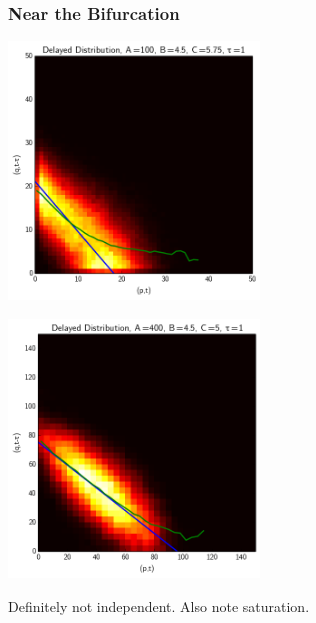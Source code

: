 \documentclass[xcolor={usenames,dvipsnames,svgnames}]{beamer}
\begin{document}
\begin{frame}
    \frametitle{Near the Bifurcation}

    \begin{overprint}
        \begin{center}
        \includegraphics[width=0.5\textwidth]{../results/presentation/ddjd-ca-a100-c5,8-t1.png}
        \end{center}
        \begin{center}
        \includegraphics[width=0.5\textwidth]{../results/presentation/ddjd-ca-a400-c5-t1.png}
        \end{center}
    \end{overprint}

    Definitely not independent. Also note saturation.
\end{frame}
\end{document}
